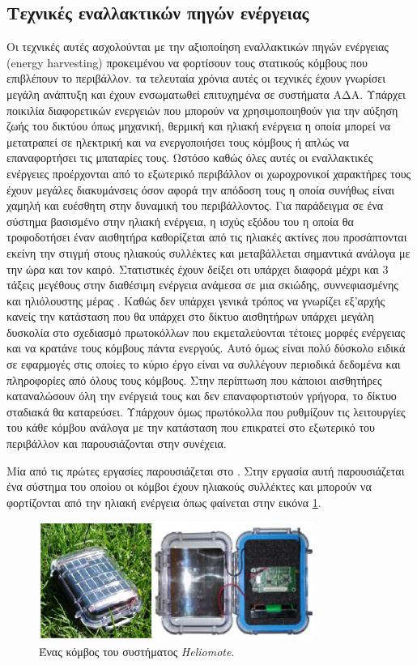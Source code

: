 \subsection{Τεχνικές εναλλακτικών πηγών ενέργειας}
Οι τεχνικές αυτές ασχολούνται με την αξιοποίηση εναλλακτικών πηγών ενέργειας (energy harvesting) προκειμένου να φορτίσουν τους στατικούς κόμβους που επιβλέπουν το
περιβάλλον. τα τελευταία χρόνια αυτές οι τεχνικές έχουν γνωρίσει μεγάλη ανάπτυξη και έχουν ενσωματωθεί επιτυχημένα σε συστήματα ΑΔΑ. Υπάρχει ποικιλία διαφορετικών
ενεργειών που μπορούν να χρησιμοποιηθούν για την αύξηση ζωής του δικτύου όπως μηχανική, θερμική και ηλιακή ενέργεια η οποία μπορεί να μετατραπεί σε ηλεκτρική και να
ενεργοποιήσει τους κόμβους ή απλώς να επαναφορτήσει τις μπαταρίες τους. Ωστόσο καθώς όλες αυτές οι εναλλακτικές ενέργειες προέρχονται από το εξωτερικό περιβάλλον οι
χωροχρονικοί χαρακτήρες τους έχουν μεγάλες διακυμάνσεις όσον αφορά την απόδοση τους η οποία συνήθως είναι χαμηλή και ευέσθητη στην δυναμική του περιβάλλοντος. Για
παράδειγμα σε ένα σύστημα βασισμένο στην ηλιακή ενέργεια, η ισχύς εξόδου του η οποία θα τροφοδοτήσει έναν αισθητήρα καθορίζεται από τις ηλιακές ακτίνες που
προσάπτονται εκείνη την στιγμή στους ηλιακούς συλλέκτες και μεταβάλλεται σημαντικά ανάλογα με την ώρα και τον καιρό. Στατιστικές έχουν δείξει οτι υπάρχει διαφορά
μέχρι και 3 τάξεις μεγέθους στην διαθέσιμη ενέργεια ανάμεσα σε μια σκιώδης, συννεφιασμένης και ηλιόλουστης μέρας \cite{harvesting_comparison}. Καθώς δεν υπάρχει
γενικά τρόπος να γνωρίζει εξ'αρχής κανείς την κατάσταση που θα υπάρχει στο δίκτυο αισθητήρων υπάρχει μεγάλη δυσκολία στο σχεδιασμό πρωτοκόλλων που εκμεταλεύονται
τέτοιες μορφές ενέργειας και να κρατάνε τους κόμβους πάντα ενεργούς. Αυτό όμως είναι πολύ δύσκολο ειδικά σε εφαρμογές στις οποίες το κύριο έργο είναι να συλλέγουν
περιοδικά δεδομένα και πληροφορίες από όλους τους κόμβους. Στην περίπτωση που κάποιοι αισθητήρες καταναλώσουν όλη την ενέργειά τους και δεν επαναφορτιστούν γρήγορα,
το δίκτυο σταδιακά θα καταρεύσει. Υπάρχουν όμως πρωτόκολλα που ρυθμίζουν τις λειτουργίες του κάθε κόμβου ανάλογα με την κατάσταση που επικρατεί στο εξωτερικό του
περιβάλλον και παρουσιάζονται στην συνέχεια.

Μία από τις πρώτες εργασίες παρουσιάζεται στο \cite{heliomote}. Στην εργασία αυτή παρουσιάζεται ένα σύστημα του οποίου οι κόμβοι έχουν ηλιακούς συλλέκτες
και μπορούν να φορτίζονται από την ηλιακή ενέργεια όπως φαίνεται στην εικόνα \ref{fig:heliomote_example}.
\begin{figure}[h]
	\centering
	\includegraphics[width=0.8\textwidth]{images/heliomote_example.eps}
	\caption{Ένας κόμβος του συστήματος \textit{Heliomote}.}
	\label{fig:heliomote_example}
\end{figure}

